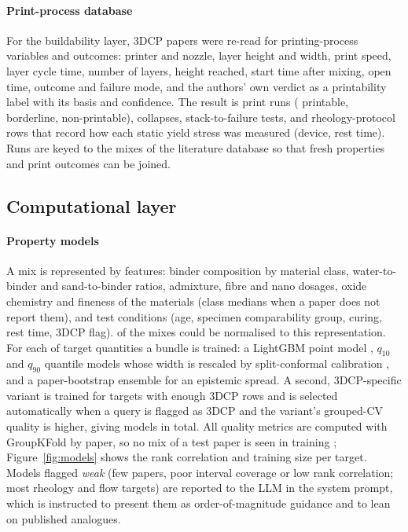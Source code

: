 \documentclass[preprint,12pt]{elsarticle}
\begin{document}
\paragraph{Print-process database} For the buildability layer, \nprintPapers{} 3DCP papers were re-read for printing-process variables and outcomes: printer and nozzle, layer height and width, print speed, layer cycle time, number of layers, height reached, start time after mixing, open time, outcome and failure mode, and the authors' own verdict as a printability label with its basis and confidence. The result is \nprintRuns{} print runs (\nprintPrintable{} printable, \nprintBorder{} borderline, \nprintNon{} non-printable), \nprintCollapses{} collapses, \nprintSTF{} stack-to-failure tests, and \nprotocolRows{} rheology-protocol rows that record how each static yield stress was measured (device, rest time). Runs are keyed to the mixes of the literature database so that fresh properties and print outcomes can be joined.

\subsection{Computational layer}

\paragraph{Property models} A mix is represented by \nnFeatures{} features: binder composition by material class, water-to-binder and sand-to-binder ratios, admixture, fibre and nano dosages, oxide chemistry and fineness of the materials (class medians when a paper does not report them), and test conditions (age, specimen comparability group, curing, rest time, 3DCP flag). \nnMixesNorm{} of the \nmixes{} mixes could be normalised to this representation. For each of \nnTargets{} target quantities a bundle is trained: a LightGBM point model \cite{ke2017lightgbm}, $q_{10}$ and $q_{90}$ quantile models whose width is rescaled by split-conformal calibration \cite{romano2019cqr}, and a paper-bootstrap ensemble for an epistemic spread. A second, 3DCP-specific variant is trained for targets with enough 3DCP rows and is selected automatically when a query is flagged as 3DCP and the variant's grouped-CV quality is higher, giving \nnModels{} models in total. All quality metrics are computed with GroupKFold by paper, so no mix of a test paper is seen in training \cite{kapoor2023leakage}; Figure~\ref{fig:models} shows the rank correlation and training size per target. Models flagged \emph{weak} (few papers, poor interval coverage or low rank correlation; most rheology and flow targets) are reported to the LLM in the system prompt, which is instructed to present them as order-of-magnitude guidance and to lean on published analogues.
\end{document}
